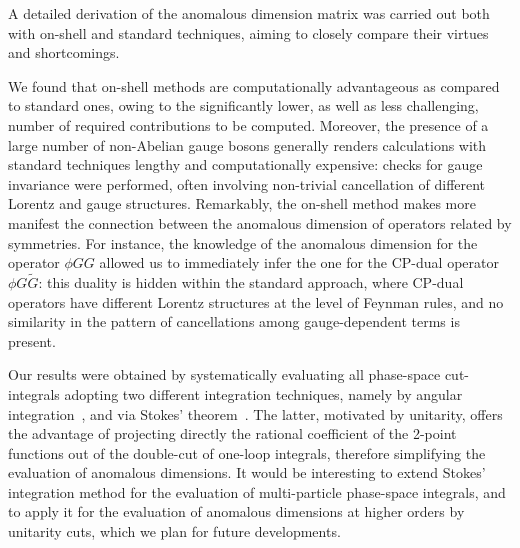 A detailed derivation of the anomalous dimension matrix was carried out both with on-shell and standard techniques, 
aiming to closely compare their virtues and shortcomings.

We found that on-shell methods are computationally advantageous as compared to standard ones, owing to the
significantly lower, as well as less challenging, number of required contributions to be computed.
Moreover, the presence of a large number of non-Abelian gauge bosons generally renders calculations with standard techniques lengthy and computationally expensive: checks for gauge invariance were performed, often involving non-trivial cancellation of different Lorentz and gauge structures.
Remarkably, the on-shell method makes more manifest the connection between the anomalous dimension of operators related by symmetries. 
For instance, the knowledge of the anomalous dimension for the operator $\phi GG$ allowed us to immediately 
infer the one for the CP-dual operator $\phi G\tilde G$: this duality is hidden within the standard approach, where CP-dual operators have different Lorentz structures at the level of Feynman rules, and no similarity in the pattern of cancellations among gauge-dependent terms is present.

Our results were obtained by systematically evaluating all phase-space cut-integrals adopting two different integration techniques, namely by angular integration~\cite{Zwiebel:2011bx}, and via Stokes' theorem~\cite{Mastrolia:2009dr}. The latter, motivated by unitarity, offers the advantage of projecting directly the rational coefficient of the 2-point functions out of the double-cut of one-loop integrals, therefore simplifying the evaluation of anomalous dimensions.  
It would be interesting to extend Stokes' integration method for the evaluation of multi-particle phase-space integrals, and to apply it for the evaluation of anomalous dimensions at higher orders by unitarity cuts, which we plan for future developments.